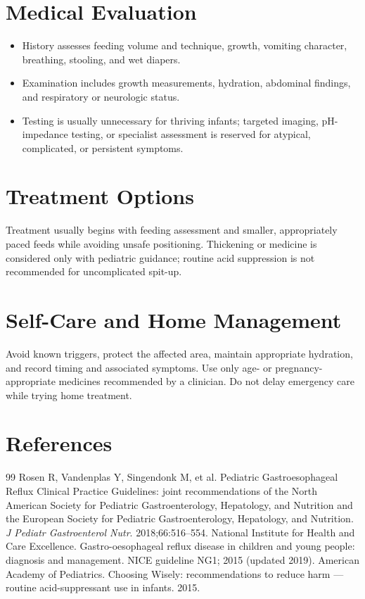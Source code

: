 \section*{Medical Evaluation}
\begin{itemize}
  \item History assesses feeding volume and technique, growth, vomiting character, breathing, stooling, and wet diapers.
  \item Examination includes growth measurements, hydration, abdominal findings, and respiratory or neurologic status.
  \item Testing is usually unnecessary for thriving infants; targeted imaging, pH-impedance testing, or specialist assessment is reserved for atypical, complicated, or persistent symptoms.
\end{itemize}

\section*{Treatment Options}
Treatment usually begins with feeding assessment and smaller, appropriately paced feeds while avoiding unsafe positioning. Thickening or medicine is considered only with pediatric guidance; routine acid suppression is not recommended for uncomplicated spit-up.

\section*{Self-Care and Home Management}
Avoid known triggers, protect the affected area, maintain appropriate hydration, and record timing and associated symptoms. Use only age- or pregnancy-appropriate medicines recommended by a clinician. Do not delay emergency care while trying home treatment.

\section*{References}
\begin{thebibliography}{99}
 Rosen R, Vandenplas Y, Singendonk M, et al. Pediatric Gastroesophageal Reflux Clinical Practice Guidelines: joint recommendations of the North American Society for Pediatric Gastroenterology, Hepatology, and Nutrition and the European Society for Pediatric Gastroenterology, Hepatology, and Nutrition. \textit{J Pediatr Gastroenterol Nutr}. 2018;66:516--554.
 National Institute for Health and Care Excellence. Gastro-oesophageal reflux disease in children and young people: diagnosis and management. NICE guideline NG1; 2015 (updated 2019).
 American Academy of Pediatrics. Choosing Wisely: recommendations to reduce harm — routine acid-suppressant use in infants. 2015.
\end{thebibliography}
